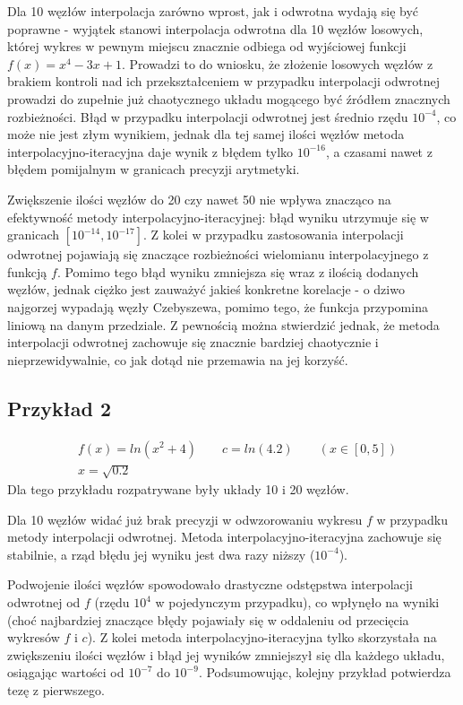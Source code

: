 \documentclass{article}
\begin{document}
Dla 10 węzłów interpolacja zarówno wprost, jak i odwrotna wydają się być poprawne - wyjątek stanowi interpolacja odwrotna dla 10 węzłów losowych, której wykres w pewnym miejscu znacznie odbiega od wyjściowej funkcji $f(x)=x^4-3x+1$. Prowadzi to do wniosku, że złożenie losowych węzłów z brakiem kontroli nad ich przekształceniem w przypadku interpolacji odwrotnej prowadzi do zupełnie już chaotycznego układu mogącego być źródłem znacznych rozbieżności. Błąd w przypadku interpolacji odwrotnej jest średnio rzędu $10^{-4}$, co może nie jest złym wynikiem, jednak dla tej samej ilości węzłów metoda interpolacyjno-iteracyjna daje wynik z błędem tylko $10^{-16}$, a czasami nawet z błędem pomijalnym w granicach precyzji arytmetyki.

Zwiększenie ilości węzłów do 20 czy nawet 50 nie wpływa znacząco na efektywność metody interpolacyjno-iteracyjnej: błąd wyniku utrzymuje się w granicach $[10^{-14},10^{-17}]$. Z kolei w przypadku zastosowania interpolacji odwrotnej pojawiają się znaczące rozbieżności wielomianu interpolacyjnego z funkcją $f$. Pomimo tego błąd wyniku zmniejsza się wraz z ilością dodanych węzłów, jednak ciężko jest zauważyć jakieś konkretne korelacje - o dziwo najgorzej wypadają węzły Czebyszewa, pomimo tego, że funkcja przypomina liniową na danym przedziale. Z pewnością można stwierdzić jednak, że metoda interpolacji odwrotnej zachowuje się znacznie bardziej chaotycznie i nieprzewidywalnie, co jak dotąd nie przemawia na jej korzyść.

\subsection{Przykład 2}

\begin{align*}
    &f(x)=ln(x^2+4) \qquad c=ln(4.2) \qquad (x\in[0, 5])\\
    &x=\sqrt{0.2}
\end{align*}
Dla tego przykładu rozpatrywane były układy 10 i 20 węzłów.

Dla 10 węzłów widać już brak precyzji w odwzorowaniu wykresu $f$ w przypadku metody interpolacji odwrotnej. Metoda interpolacyjno-iteracyjna zachowuje się stabilnie, a rząd błędu jej wyniku jest dwa razy niższy ($10^{-4}$).

Podwojenie ilości węzłów spowodowało drastyczne odstępstwa interpolacji odwrotnej od $f$ (rzędu $10^4$ w pojedynczym przypadku), co wpłynęło na wyniki (choć najbardziej znaczące błędy pojawiały się w oddaleniu od przecięcia wykresów $f$ i $c$). Z kolei metoda interpolacyjno-iteracyjna tylko skorzystała na zwiększeniu ilości węzłów i błąd jej wyników zmniejszył się dla każdego układu, osiągając wartości od $10^{-7}$ do $10^{-9}$. Podsumowując, kolejny przykład potwierdza tezę z pierwszego.
\end{document}
